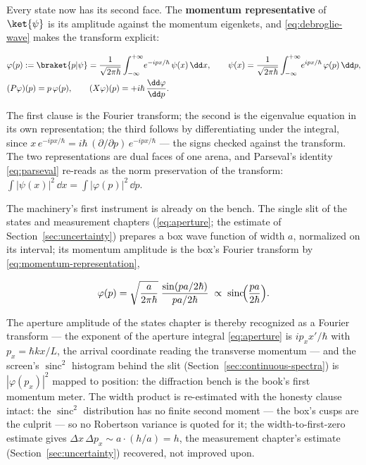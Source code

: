 Every state now has its second face. The \textbf{momentum representative} of $\ket{\psi}$ is its amplitude against the momentum eigenkets, and \eqref{eq:debroglie-wave} makes the transform explicit:
\begin{linenomath}
    \begin{equation}
        \begin{split}
            &\varphi(p) := \braket{p|\psi} = \frac{1}{\sqrt{2\pi\hbar}}\int_{-\infty}^{+\infty}\!e^{-ipx/\hbar}\,\psi(x)\,\dd x, \qquad \psi(x) = \frac{1}{\sqrt{2\pi\hbar}}\int_{-\infty}^{+\infty}\!e^{ipx/\hbar}\,\varphi(p)\,\dd p, \\
            &(P\varphi)(p) = p\,\varphi(p), \qquad (X\varphi)(p) = +i\hbar\,\frac{\dd\varphi}{\dd p} .
        \end{split}
        \label{eq:momentum-representation}
    \end{equation}
\end{linenomath}
The first clause is the Fourier transform; the second is the eigenvalue equation in its own representation; the third follows by differentiating under the integral, since $x\,e^{-ipx/\hbar} = i\hbar\,(\partial/\partial p)\,e^{-ipx/\hbar}$ --- the signs checked against the transform. The two representations are dual faces of one arena, and Parseval's identity \eqref{eq:parseval} re-reads as the norm preservation of the transform: $\int\!|\psi(x)|^2\,\dd x = \int\!|\varphi(p)|^2\,\dd p$.

The machinery's first instrument is already on the bench. The single slit of the states and measurement chapters (\eqref{eq:aperture}; the estimate of Section~\ref{sec:uncertainty}) prepares a box wave function of width $a$, normalized on its interval; its momentum amplitude is the box's Fourier transform by \eqref{eq:momentum-representation},
\begin{linenomath}
    \begin{equation*}
        \varphi(p) = \sqrt{\frac{a}{2\pi\hbar}}\;\frac{\sin(pa/2\hbar)}{pa/2\hbar} \;\propto\; \operatorname{sinc}\!\Bigl(\frac{pa}{2\hbar}\Bigr) .
    \end{equation*}
\end{linenomath}
The aperture amplitude of the states chapter is thereby recognized as a Fourier transform --- the exponent of the aperture integral \eqref{eq:aperture} is $ip_xx'/\hbar$ with $p_x = \hbar kx/L$, the arrival coordinate reading the transverse momentum --- and the screen's $\operatorname{sinc}^2$ histogram behind the slit (Section~\ref{sec:continuous-spectra}) is $|\varphi(p_x)|^2$ mapped to position: the diffraction bench is the book's first momentum meter. The width product is re-estimated with the honesty clause intact: the $\operatorname{sinc}^2$ distribution has no finite second moment --- the box's cusps are the culprit --- so no Robertson variance is quoted for it; the width-to-first-zero estimate gives $\Delta x\,\Delta p_x \sim a\cdot(h/a) = h$, the measurement chapter's estimate (Section~\ref{sec:uncertainty}) recovered, not improved upon.

